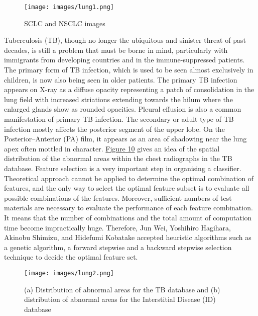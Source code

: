 \documentclass[hidelinks,12pt]{article}
\begin{document}
\begin{figure}[h]
      \texttt{[image: images/lung1.png]}
      \centering
      \label{fig:8}
      \caption{SCLC and NSCLC images}
\end{figure}  

Tuberculosis (TB), though no longer the ubiquitous and sinister threat of past decades, is
still a problem that must be borne in mind, particularly with immigrants from developing
countries and in the immune-suppressed patients. The primary form of TB infection,
which is used to be seen almost exclusively in children, is now also being seen in older
patients. The primary TB infection appears on X-ray as a diffuse opacity representing a
patch of consolidation in the lung field with increased striations extending towards
the hilum where the enlarged glands show as rounded opacities. Pleural effusion is
also a common manifestation of primary TB infection. The secondary or adult type
of TB infection mostly affects the posterior segment of the upper lobe. On the
Posterior–Anterior (PA) film, it appears as an area of shadowing near the lung apex often
mottled in character. \hyperref[fig:9]{Figure 10} gives an idea of the spatial distribution of the abnormal
areas within the chest radiographs in the TB database.
Feature selection is a very important step in organising a classifier. Theoretical
approach cannot be applied to determine the optimal combination of features, and the
only way to select the optimal feature subset is to evaluate all possible combinations of
the features. Moreover, sufficient numbers of test materials are necessary to evaluate the
performance of each feature combination. It means that the number of combinations and
the total amount of computation time become impractically huge. Therefore, Jun Wei,
Yoshihiro Hagihara, Akinobu Shimizu, and Hidefumi Kobatake accepted heuristic
algorithms such as a genetic algorithm, a forward stepwise and a backward stepwise
selection technique to decide the optimal feature set.

\newpage
\begin{figure}[h]
      \texttt{[image: images/lung2.png]}
      \centering
      \label{fig:9}
      \caption{(a) Distribution of abnormal areas for the TB database and (b) distribution of abnormal areas for the Interstitial Disease (ID) database}
\end{figure} 
\end{document}
